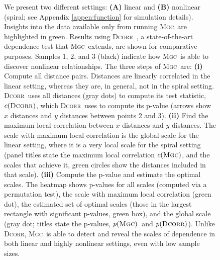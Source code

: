 \documentclass[11pt]{article}
\providecommand{\sct}[1]{{\normalfont\textsc{#1}}}
\newcommand{\GG}{c}
\newcommand{\Mgc}{\sct{Mgc}}
\newcommand{\Dcorr}{\sct{Dcorr}}
\begin{document}
\begin{figure}
{%
We present two different settings: \textbf{(A)} linear  and \textbf{(B)} nonlinear (spiral; see Appendix \ref{appen:function} for simulation details). Insights into the data available only from running \Mgc~are highlighted in green.  Results using \Dcorr~\cite{SzekelyRizzo2009}, a state-of-the-art dependence test that \Mgc~extends, are shown for comparative purposes. 
% 
Samples $1$, $2$, and $3$ (black) indicate how \Mgc~is able to discover nonlinear relationships. 
% 
The three steps of \Mgc~are:
% 
\textbf{(i)} Compute all distance pairs. Distances are linearly correlated in the linear setting, whereas they are, in general, not in the spiral setting.  \Dcorr~uses all distances (gray dots) to compute its test statistic, $\GG(\Dcorr)$, which \Dcorr~uses to compute its p-value (arrows show $x$ distances and $y$ distances between points 2 and 3).
% 
\textbf{(ii)} Find the maximum local correlation between $x$ distances and $y$ distances.  The scale with maximum local correlation is the global scale for the linear setting, where it is a very local scale for the spiral setting (panel titles state the maximum local correlation $\GG(\Mgc)$, and the scales that achieve it, green circles show the distances included in that scale).
\textbf{(iii)} Compute the p-value and estimate the optimal scales.
The heatmap shows p-values for all scales (computed via a permutation test), the scale with maximum local correlation (green dot), the estimated set of optimal scales  (those in the largest rectangle with significant p-values, green box), and the global scale (gray dot; 
titles state the p-values,  $p(\Mgc)$~and $p(\Dcorr)$).
% 
Unlike \Dcorr, \Mgc~is able to detect and reveal the scales of dependence in both linear and highly nonlinear settings, even with low sample sizes.}
\label{f:newschem}
\end{figure}
\end{document}
